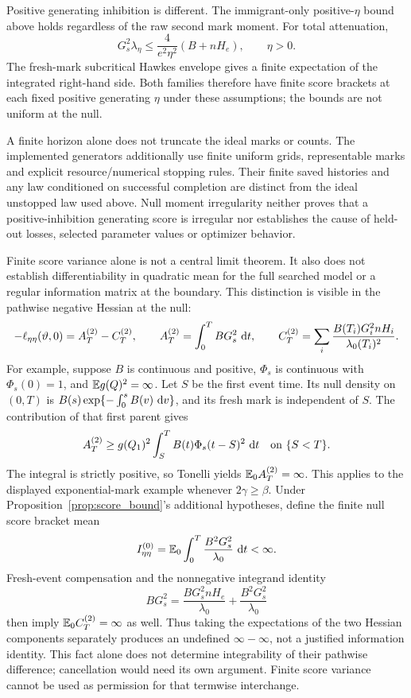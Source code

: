 Positive generating inhibition is different. The immigrant-only positive-\(\eta\) bound above holds regardless of the raw second mark moment. For total attenuation,
\[
G_s^2\lambda_\eta
\leq \frac{4}{e^2\eta^2}(B+nH_e),
\qquad \eta>0.
\]
The fresh-mark subcritical Hawkes envelope gives a finite expectation of the integrated right-hand side. Both families therefore have finite score brackets at each fixed positive generating \(\eta\) under these assumptions; the bounds are not uniform at the null.

A finite horizon alone does not truncate the ideal marks or counts. The implemented generators additionally use finite uniform grids, representable marks and explicit resource/numerical stopping rules. Their finite saved histories and any law conditioned on successful completion are distinct from the ideal unstopped law used above. Null moment irregularity neither proves that a positive-inhibition generating score is irregular nor establishes the cause of held-out losses, selected parameter values or optimizer behavior.

Finite score variance alone is not a central limit theorem. It also does not establish differentiability in quadratic mean for the full searched model or a regular information matrix at the boundary. This distinction is visible in the pathwise negative Hessian at the null:
\[
-\ell_{\eta\eta}(\vartheta,0)=A_T^{(2)}-C_T^{(2)},\qquad
A_T^{(2)}=\int_0^T B G_s^2\,\mathop{}\!\mathrm{d} t,\qquad
C_T^{(2)}=\sum_i\frac{B(T_i)G_i^2 nH_i}{\lambda_0(T_i)^2}.
\]
For example, suppose \(B\) is continuous and positive, \(\Phi_s\) is continuous with \(\Phi_s(0)=1\), and \(\mathbb{E} g(Q)^2=\infty\). Let \(S\) be the first event time. Its null density on \((0,T)\) is \(B(s)\exp\{-\int_0^sB(v)\,\mathop{}\!\mathrm{d} v\}\), and its fresh mark is independent of \(S\). The contribution of that first parent gives
\[
A_T^{(2)}\geq g(Q_1)^2\int_S^T B(t)\Phi_s(t-S)^2\,\mathop{}\!\mathrm{d} t
\quad\text{on }\{S<T\}.
\]
The integral is strictly positive, so Tonelli yields \(\mathbb{E}_0 A_T^{(2)}=\infty\). This applies to the displayed exponential-mark example whenever \(2\gamma\geq\beta\). Under Proposition~\ref{prop:score_bound}'s additional hypotheses, define the finite null score bracket mean
\[
I_{\eta\eta}^{(0)}=\mathbb{E}_0\int_0^T\frac{B^2G_s^2}{\lambda_0}\,\mathop{}\!\mathrm{d} t<\infty.
\]
Fresh-event compensation and the nonnegative integrand identity
\[
BG_s^2=\frac{BG_s^2nH_e}{\lambda_0}
       +\frac{B^2G_s^2}{\lambda_0}
\]
then imply \(\mathbb{E}_0 C_T^{(2)}=\infty\) as well. Thus taking the expectations of the two Hessian components separately produces an undefined \(\infty-\infty\), not a justified information identity. This fact alone does not determine integrability of their pathwise difference; cancellation would need its own argument. Finite score variance cannot be used as permission for that termwise interchange.

